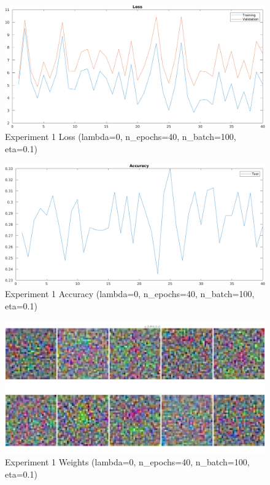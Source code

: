     \begin{figure}[ht]
        \includegraphics[width=\textwidth]{../code/result_pics/lambda=0, n_epochs=40, n_batch=100, eta=.1/loss.png}
        \caption{Experiment 1 Loss (lambda=0, n\_epochs=40, n\_batch=100, eta=0.1)}
        \label{fig:loss1}
    \end{figure}

    \begin{figure}[ht]
        \includegraphics[width=\textwidth]{../code/result_pics/lambda=0, n_epochs=40, n_batch=100, eta=.1/accuracy.png}
        \caption{Experiment 1 Accuracy (lambda=0, n\_epochs=40, n\_batch=100, eta=0.1)}
        \label{fig:accuracy1}
    \end{figure}

    \begin{figure}[ht]
        \includegraphics[width=\textwidth]{../code/result_pics/lambda=0, n_epochs=40, n_batch=100, eta=.1/weights.png}
        \caption{Experiment 1 Weights (lambda=0, n\_epochs=40, n\_batch=100, eta=0.1)}
        \label{fig:weights1}
    \end{figure}

